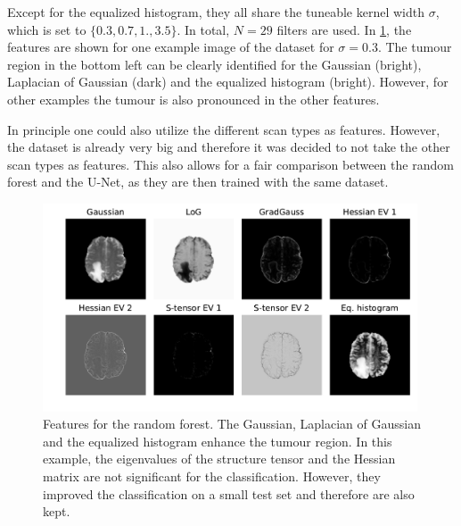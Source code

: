 \documentclass[final]{article}
\begin{document}
Except for the equalized histogram, they all share the tuneable kernel width
$\sigma$, which is set to $\{0.3, 0.7, 1., 3.5\}$. In total, $N=29$ filters are
used. In \cref{fig:features}, the features are shown for one example image of
the dataset for $\sigma = 0.3$. The tumour region in the bottom left can be
clearly identified for the Gaussian (bright), Laplacian of Gaussian (dark) and
the equalized histogram (bright). However, for other examples the tumour is also
pronounced in the other features.

In principle one could also utilize the different scan types as features.
However, the dataset is already very big and therefore it was decided to not
take the other scan types as features. This also allows for a fair comparison
between the random forest and the U-Net, as they are then trained with the same
dataset.\\

\begin{figure}
\centering
\includegraphics[width=0.99\textwidth]{features}
\caption{Features for the random forest. The Gaussian, Laplacian of Gaussian
and the equalized histogram enhance the tumour region. In this example, the
eigenvalues of the structure tensor and the Hessian matrix are not significant
for the classification. However, they improved the classification on a small
test set and therefore are also kept.}
\label{fig:features}
\end{figure}
\end{document}
